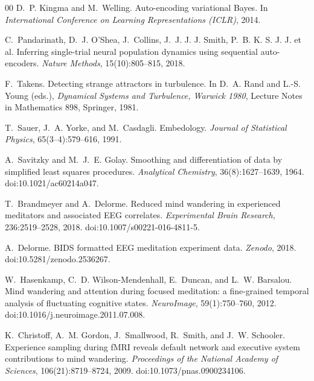 \documentclass[5p,twocolumn,authoryear]{elsarticle}
\begin{document}
\begin{thebibliography}{00}
D.~P. Kingma and M.~Welling.
\newblock Auto-encoding variational Bayes.
\newblock In \emph{International Conference on Learning Representations (ICLR)}, 2014.

C.~Pandarinath, D.~J. O'Shea, J.~Collins, J.~J. J. J. Smith, P.~B. K. S. J. J. et al.
\newblock Inferring single-trial neural population dynamics using sequential auto-encoders.
\newblock \emph{Nature Methods}, 15(10):805--815, 2018.

F.~Takens.
\newblock Detecting strange attractors in turbulence.
\newblock In D.~A. Rand and L.-S. Young (eds.), \emph{Dynamical Systems and Turbulence, Warwick 1980}, Lecture Notes in Mathematics 898, Springer, 1981.

T.~Sauer, J.~A. Yorke, and M.~Casdagli.
\newblock Embedology.
\newblock \emph{Journal of Statistical Physics}, 65(3--4):579--616, 1991.

A.~Savitzky and M.~J.~E. Golay.
\newblock Smoothing and differentiation of data by simplified least squares procedures.
\newblock \emph{Analytical Chemistry}, 36(8):1627--1639, 1964.
\newblock doi:10.1021/ac60214a047.

T.~Brandmeyer and A.~Delorme.
\newblock Reduced mind wandering in experienced meditators and associated EEG correlates.
\newblock \emph{Experimental Brain Research}, 236:2519--2528, 2018.
\newblock doi:10.1007/s00221-016-4811-5.

A.~Delorme.
\newblock BIDS formatted EEG meditation experiment data.
\newblock \emph{Zenodo}, 2018.
\newblock doi:10.5281/zenodo.2536267.

W.~Hasenkamp, C.~D. Wilson-Mendenhall, E.~Duncan, and L.~W. Barsalou.
\newblock Mind wandering and attention during focused meditation: a fine-grained temporal analysis of fluctuating cognitive states.
\newblock \emph{NeuroImage}, 59(1):750--760, 2012.
\newblock doi:10.1016/j.neuroimage.2011.07.008.

K.~Christoff, A.~M. Gordon, J.~Smallwood, R.~Smith, and J.~W. Schooler.
\newblock Experience sampling during fMRI reveals default network and executive system contributions to mind wandering.
\newblock \emph{Proceedings of the National Academy of Sciences}, 106(21):8719--8724, 2009.
\newblock doi:10.1073/pnas.0900234106.


\end{thebibliography}
\end{document}
